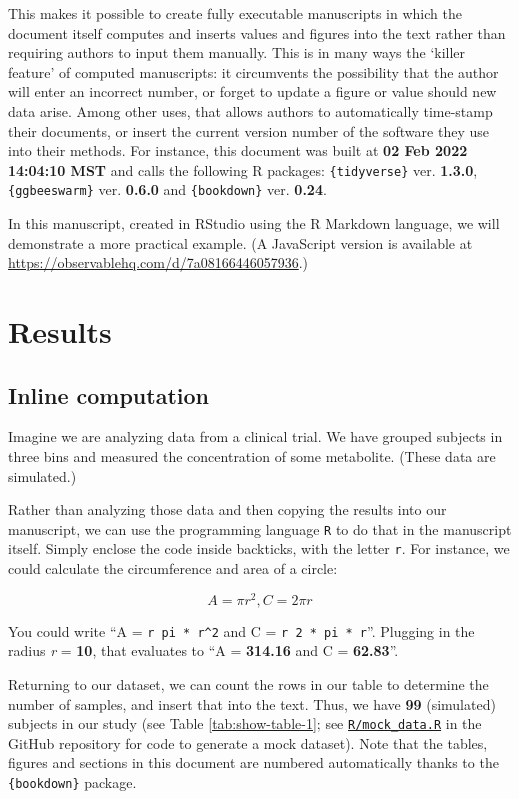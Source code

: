 \documentclass[smallextended]{svjour3}       %
\begin{document}
This makes it possible to create fully executable manuscripts in which the document itself computes and inserts values and figures into the text rather than requiring authors to input them manually. This is in many ways the `killer feature' of computed manuscripts: it circumvents the possibility that the author will enter an incorrect number, or forget to update a figure or value should new data arise. Among other uses, that allows authors to automatically time-stamp their documents, or insert the current version number of the software they use into their methods. For instance, this document was built at \textbf{02 Feb 2022 14:04:10 MST} and calls the following R packages: \texttt{\{tidyverse\}} ver. \textbf{1.3.0}, \texttt{\{ggbeeswarm\}} ver. \textbf{0.6.0} and \texttt{\{bookdown\}} ver. \textbf{0.24}.

In this manuscript, created in RStudio using the R Markdown language, we will demonstrate a more practical example. (A JavaScript version is available at \url{https://observablehq.com/d/7a08166446057936}.)

\hypertarget{results}{%
\section{Results}\label{results}}

\hypertarget{sec:1}{%
\subsection{Inline computation}\label{sec:1}}

Imagine we are analyzing data from a clinical trial. We have grouped subjects in three bins and measured the concentration of some metabolite. (These data are simulated.)

Rather than analyzing those data and then copying the results into our manuscript, we can use the programming language \texttt{R} to do that in the manuscript itself. Simply enclose the code inside backticks, with the letter \texttt{r}. For instance, we could calculate the circumference and area of a circle:

\[A = \pi r^2, C = 2 \pi r\]

You could write ``A = \texttt{\textasciigrave{}r\ pi\ *\ r\^{}2\textasciigrave{}} and C = \texttt{\textasciigrave{}r\ 2\ *\ pi\ *\ r\textasciigrave{}}''. Plugging in the radius \emph{r} = \textbf{10}, that evaluates to ``A = \textbf{314.16} and C = \textbf{62.83}''.

Returning to our dataset, we can count the rows in our table to determine the number of samples, and insert that into the text. Thus, we have \textbf{99} (simulated) subjects in our study (see Table \ref{tab:show-table-1}; see \href{https://github.com/jperkel/computed_manuscript/blob/main/R/mock_data.R}{\texttt{R/mock\_data.R}} in the GitHub repository for code to generate a mock dataset). Note that the tables, figures and sections in this document are numbered automatically thanks to the \texttt{\{bookdown\}} package.
\end{document}
